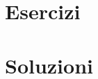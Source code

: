 \documentclass[oneside]{scrbook}
\begin{document}
				
%
	
\section{Esercizi}






%
%
%
%
%

\clearpage
\section*{Soluzioni}
\shipoutAnswer
\end{document}
